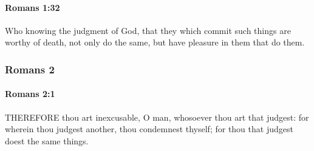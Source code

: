 		\paragraph{Romans 1:32} %
			\label{ROMANS-1-32}

			Who knowing the judgment of God, that they which commit such things are worthy of death, not only do the same, but have pleasure in them that do them.

			\begin{framed}
			\scriptsize
				\begin{compactdesc}
					\item[SBLG] 
				\end{compactdesc}
			\end{framed}

	\subsubsection{Romans 2} %
		\label{ROMANS-2}
		
		\paragraph{Romans 2:1} %
			\label{ROMANS-2-1}

			THEREFORE thou art inexcusable, O man, whosoever thou art that judgest: for wherein thou judgest another, thou condemnest thyself; for thou that judgest doest the same things.


